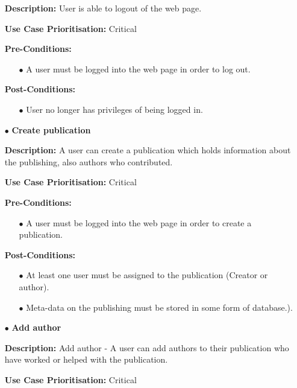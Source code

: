 \documentclass[a4paper,12pt]{article}
\begin{document}
\begin{itemize}
		\textbf{Description:} User is able to logout of the web page.\newline
		
		\textbf{Use Case Prioritisation:} Critical\newline
		
		\textbf{Pre-Conditions:}
		\begin{itemize}
			\item[$\bullet$]A user must be logged into the web page in order to log out.
			\\
		\end{itemize}
		\textbf{Post-Conditions: }
		\begin{itemize}
			\item[$\bullet$]User no longer has privileges of being logged in.
			\\
		\end{itemize}
		\newpage
		\item[$\bullet$]\textbf{Create publication}\newline

		\textbf{Description:} A user can create a publication which holds information about the publishing, also authors who contributed.\newline
	
		\textbf{Use Case Prioritisation:} Critical\newline

		\textbf{Pre-Conditions:}
		\begin{itemize}
			\item[$\bullet$]A user must be logged into the web page in order to create a publication.
			\\
		\end{itemize}
		\textbf{Post-Conditions: }
		\begin{itemize}
			\item[$\bullet$]At least one user must be assigned to the publication (Creator or author).
			\item[$\bullet$]Meta-data on the publishing must be stored in some form of database.).
			\\
		\end{itemize}
		\item[$\bullet$]\textbf{Add author}\newline

		\textbf{Description:} Add author - A user can add authors to their publication who have worked or helped with the publication.\newline
	
		\textbf{Use Case Prioritisation:} Critical\newline


\end{itemize}
\end{document}
